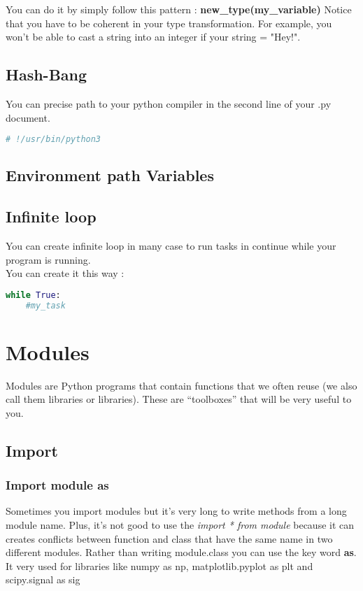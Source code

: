 \documentclass[a4paper, 12pt, titlepage]{scrartcl} %
\begin{document}
You can do it by simply follow this pattern : \textbf{new\_type(my\_variable)}
Notice that you have to be coherent in your type transformation. For example, you won't be able to cast a string into an integer if your string = "Hey!".

\subsection{Hash-Bang}
You can precise path to your python compiler in the second line of your .py document.
\begin{lstlisting}[language=Python]
# !/usr/bin/python3
\end{lstlisting} \vspace{5mm}

\subsection{Environment path Variables}
\label{subsec:PathVariables}

\subsection{Infinite loop}
\label{subsec:While}
You can create infinite loop in many case to run tasks in continue while your program is running. \\
You can create it this way :
\begin{lstlisting}[language=Python]
while True:
    #my_task
\end{lstlisting} \vspace{5mm}


\newpage
\section{Modules}
Modules are Python programs that contain functions that we often reuse (we also call them libraries or libraries). These are “toolboxes” that will be very useful to you.

\subsection{Import}
\label{subsec:Import}

\subsubsection{Import module as}
\label{As}
Sometimes you import modules but it's very long to write methods from a long module name. Plus, it's not good to use the \textit{import * from module} because it can creates conflicts between function and class that have the same name in two different modules. Rather than writing module.class you can use the key word \textbf{as}. It very used for libraries like numpy as np, matplotlib.pyplot as plt and scipy.signal as sig
\end{document}

